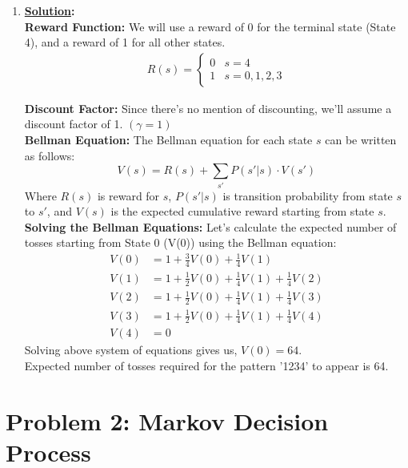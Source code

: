 \documentclass[12pt]{article}
\newcommand{\solution}{\noindent \textbf{\underline{Solution}: }}
\begin{document}
\begin{enumerate}
     \item  \solution \\ 
    \textbf{Reward Function:} We will use a reward of 0 for the terminal state (State 4), and a reward of 1 for all other states.
    \begin{align*}
        R\left(s\right) = 
        \begin{cases*}
            0 & s = 4 \\
            1 & s = 0,1,2,3
        \end{cases*}
    \end{align*}

    \textbf{Discount Factor:} Since there's no mention of discounting, we'll assume a discount factor of 1. $ \left(\gamma = 1\right) $ \\

    \textbf{Bellman Equation:} The Bellman equation for each state $s$ can be written as follows:
    \begin{equation*}
        V(s) = R(s) + \sum_{s'} P(s' | s) \cdot V(s')
    \end{equation*}
    Where $R\left(s\right)$ is reward for $s$, $P(s' | s)$ is transition probability from 
    state $s$ to $s'$, and $V(s)$ is the expected cumulative reward starting from state $s$. \\

    \textbf{Solving the Bellman Equations:}
    Let's calculate the expected number of tosses starting from State 0 (V(0)) using the Bellman equation:
    \begin{align*}
        V(0) &= 1 + \frac{3}{4} V(0) + \frac{1}{4} V(1) \\
        V(1) &= 1 + \frac{1}{2} V(0) + \frac{1}{4} V(1) + \frac{1}{4} V(2) \\
        V(2) &= 1 + \frac{1}{2} V(0) + \frac{1}{4} V(1) + \frac{1}{4} V(3) \\
        V(3) &= 1 + \frac{1}{2} V(0) + \frac{1}{4} V(1) + \frac{1}{4} V(4) \\
        V(4) &= 0
    \end{align*}
    Solving above system of equations gives us, $V(0) = 64$. \\
    Expected number of tosses required for the pattern '1234' to appear is 64.
\end{enumerate}

\section*{Problem 2:  Markov Decision Process}
\end{document}

